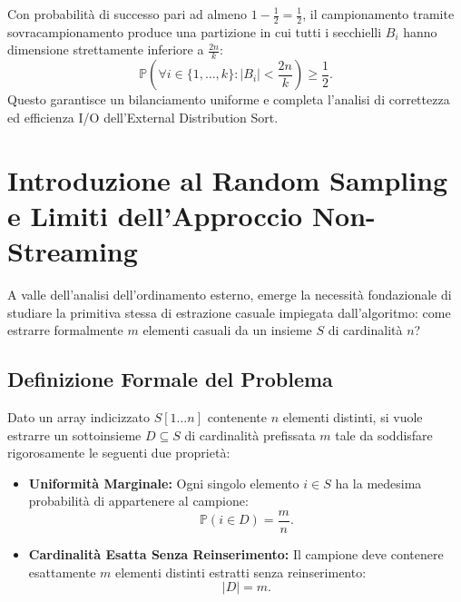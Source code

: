 \begin{theorem}
Con probabilità di successo pari ad almeno $1 - \frac{1}{2} = \frac{1}{2}$, il campionamento tramite sovracampionamento produce una partizione in cui tutti i secchielli $B_i$ hanno dimensione strettamente inferiore a $\frac{2n}{k}$:
\begin{equation}
  \mathbb{P}\left(\forall i \in \{1, \dots, k\} \colon |B_i| < \frac{2n}{k}\right) \ge \frac{1}{2}.
\end{equation}
Questo garantisce un bilanciamento uniforme e completa l'analisi di correttezza ed efficienza I/O dell'External Distribution Sort. \qedhere
\end{theorem}

\FloatBarrier
\section{Introduzione al Random Sampling e Limiti dell'Approccio Non-Streaming}
\label{sec:intro-random-sampling-non-streaming}

A valle dell'analisi dell'ordinamento esterno, emerge la necessità fondazionale di studiare la primitiva stessa di estrazione casuale impiegata dall'algoritmo: come estrarre formalmente $m$ elementi casuali da un insieme $S$ di cardinalità $n$?

\FloatBarrier
\subsection{Definizione Formale del Problema}
Dato un array indicizzato $S[1 \dots n]$ contenente $n$ elementi distinti, si vuole estrarre un sottoinsieme $D \subseteq S$ di cardinalità prefissata $m$ tale da soddisfare rigorosamente le seguenti due proprietà:
\begin{itemize}
  \item \textbf{Uniformità Marginale:} Ogni singolo elemento $i \in S$ ha la medesima probabilità di appartenere al campione:
  \begin{equation}
    \mathbb{P}(i \in D) = \frac{m}{n}.
  \end{equation}
  \item \textbf{Cardinalità Esatta Senza Reinserimento:} Il campione deve contenere esattamente $m$ elementi distinti estratti senza reinserimento:
  \begin{equation}
    |D| = m.
  \end{equation}
\end{itemize}

